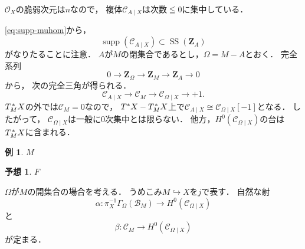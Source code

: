 \documentclass[leqno, 10pt, a4paper, dvipdfmx]{jsarticle}
\theoremstyle{definition}
\newcommand{\zz}{\mathbf{Z}}
\newcommand{\mcal}{\mathcal}
\numberwithin{equation}{section}
\newcommand{\supp}{\mathop{\mathrm{supp}}\nolimits}
\newcommand{\cO}{\mcal{O}}
\newcommand{\muS}{\mathop{\mathrm{SS}}\nolimits}
\theoremstyle{mystyle}
\newtheorem{CNJ}[AXM]{予想}
\newtheorem{EG}[AXM]{例}
\newcommand{\cotb}[1][]{T^{\ast}{#1}}
\newcommand{\conm}[2][]{T_{#1}^{\hspace{0.7pt}\ast}{#2}}
\newcommand{\hfun}[1][]{\mathcal{B}_{#1}}
\newcommand{\mfun}[1][]{\mathcal{C}_{#1}}
\begin{document}
\(\cO_X\)の脆弱次元は\(n\)なので，
複体\(\mfun[A\mid X]\)は次数\(\leqq0\)に集中している．

\eqref{eq:supp-muhom}から，\begin{equation}\label{eq:supp-mild-mfun}
    \supp(\mfun[A\mid X])\subset\muS(\zz_A)
\end{equation}
がなりたることに注意．
\(A\)が\(M\)の閉集合であるとし，\(\varOmega=M-A\)とおく．
完全系列\[0\to\zz_{\varOmega}\to\zz_{M}\to \zz_{A}\to0\]から，
次の完全三角が得られる．
\begin{equation}\label{eq:dt-mild-mfun}
    \mfun[A\mid X]\to \mfun[M]\to \mfun[\varOmega\mid X]\to+1.
\end{equation}
\(\conm[M]{X}\)の外では\(\mfun[M]=0\)なので，
\(\cotb[X]-\conm[M]{X}\)上で\(
    \mfun[A\mid X]\cong \mfun[\varOmega\mid X][-1]
\)となる．
したがって，
\(\mfun[\varOmega\mid X]\)は一般に\(0\)次集中とは限らない．
他方，\(H^{0}(\mfun[\varOmega\mid X])\)の台は\(\conm[M]{X}\)に含まれる．

\begin{EG}
    \(M\)
\end{EG}

\begin{CNJ}
    \(F\)
\end{CNJ}

\(\varOmega\)が\(M\)の開集合の場合を考える．
うめこみ\(M\hookrightarrow X\)を\(j\)で表す．
自然な射\begin{equation}
    \alpha\colon 
    \pi_{X}^{-1}\Gamma_{\varOmega}(\hfun[M])
    \to 
    H^{0}(\mfun[\varOmega\mid X])
\end{equation}
と
\begin{equation}
    \beta\colon 
    \mfun[M]
    \to 
    H^{0}(\mfun[\varOmega\mid X])
\end{equation}
が定まる．
\end{document}
